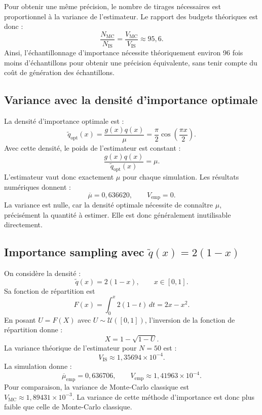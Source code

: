 \documentclass[11pt]{article}
\theoremstyle{definition}
\theoremstyle{remark}
\begin{document}
Pour obtenir une même précision, le nombre de tirages nécessaires est
proportionnel à la variance de l'estimateur. Le rapport des budgets théoriques
est donc :
\[
\frac{N_{\mathrm{MC}}}{N_{\mathrm{IS}}}
=\frac{V_{\mathrm{MC}}}{V_{\mathrm{IS}}}
\approx 95{,}6.
\]
Ainsi, l'échantillonnage d'importance nécessite théoriquement environ 96 fois
moins d'échantillons pour obtenir une précision équivalente, sans tenir compte
du coût de génération des échantillons.

\subsection{Variance avec la densité d'importance optimale}

La densité d'importance optimale est :
\[
\widetilde q_{\mathrm{opt}}(x)
=\frac{g(x)q(x)}{\mu}
=\frac{\pi}{2}\cos\left(\frac{\pi x}{2}\right).
\]
Avec cette densité, le poids de l'estimateur est constant :
\[
\frac{g(x)q(x)}{\widetilde q_{\mathrm{opt}}(x)}
=\mu.
\]
L'estimateur vaut donc exactement $\mu$ pour chaque simulation. Les résultats
numériques donnent :
\[
\overline{\mu}=0{,}636620,
\qquad V_{\mathrm{emp}}=0.
\]
La variance est nulle, car la densité optimale nécessite de connaître $\mu$,
précisément la quantité à estimer. Elle est donc généralement inutilisable
directement.

\subsection{Importance sampling avec $\widetilde q(x)=2(1-x)$}

On considère la densité :
\[
\widetilde q(x)=2(1-x),\qquad x\in[0,1].
\]
Sa fonction de répartition est
\[
F(x)=\int_0^x 2(1-t)\,dt=2x-x^2.
\]
En posant $U=F(X)$ avec $U\sim\mathcal U([0,1])$, l'inversion de la fonction
de répartition donne :
\[
\boxed{X=1-\sqrt{1-U}.}
\]
La variance théorique de l'estimateur pour $N=50$ est :
\[
V_{\mathrm{IS}}\approx 1{,}35694\times10^{-4}.
\]
La simulation donne :
\[
\overline{\mu}_{\mathrm{emp}}=0{,}636706,
\qquad
V_{\mathrm{emp}}\approx 1{,}41963\times10^{-4}.
\]
Pour comparaison, la variance de Monte-Carlo classique est
$V_{\mathrm{MC}}\approx 1{,}89431\times10^{-3}$. La variance de cette méthode
d'importance est donc plus faible que celle de Monte-Carlo classique.

\end{document}
